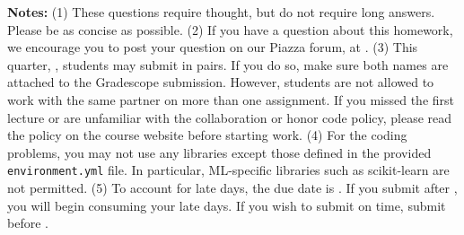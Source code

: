 {\bf Notes:} (1) These questions require thought, but do not require long
answers. Please be as concise as possible.  (2) If you have a question
about this homework, we encourage you to post your question on our
Piazza forum, at \piazza. (3) This quarter, \qtr, students may submit in pairs. If you do so, make sure both names are attached to the Gradescope submission. However, students are not allowed to work with the same partner on more than one assignment. If you
missed the first lecture or are unfamiliar with the collaboration or honor
code policy, please read the policy on the course website before starting work.
(4) For the coding problems, you may not
use any libraries except those defined in the provided \texttt{environment.yml}
file. In particular, ML-specific libraries such as scikit-learn are not
permitted. (5) To account for late days, the due date is \due. If you submit after
\due, you will begin consuming your
late days. If you wish to submit on time, submit before \due.

